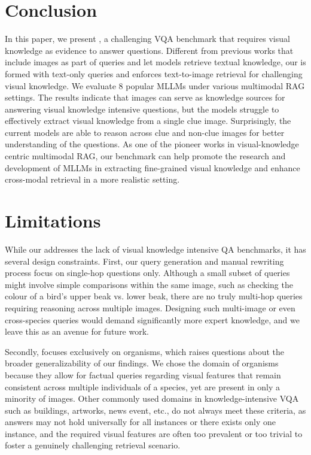 \section{Conclusion}
In this paper, we present \dsns, a challenging VQA benchmark that requires visual knowledge as evidence to answer questions. Different from previous works that include images as part of queries and let models retrieve textual knowledge, our \ds is formed with text-only queries and enforces text-to-image retrieval for challenging visual knowledge. We evaluate 8 popular MLLMs under various multimodal RAG settings. The results indicate that images can serve as knowledge sources for answering visual knowledge intensive questions, but the models struggle to effectively extract visual knowledge from a single clue image. Surprisingly, the current models are able to reason across clue and non-clue images for better understanding of the questions. As one of the pioneer works in visual-knowledge centric multimodal RAG, our benchmark can help promote the research and development of MLLMs in extracting fine-grained visual knowledge and enhance cross-modal retrieval in a more realistic setting.

\section*{Limitations}

While our \ds  addresses the lack of visual knowledge intensive QA benchmarks, it has several design constraints. First, our query generation and manual rewriting process focus on single-hop questions only. Although a small subset of queries might involve simple comparisons within the same image, such as checking the colour of a bird’s upper beak vs. lower beak, there are no truly multi-hop queries requiring reasoning across multiple images. Designing such multi-image or even cross-species queries would demand significantly more expert knowledge, and we leave this as an avenue for future work.

Secondly, \ds focuses exclusively on organisms, which raises questions about the broader generalizability of our findings. We chose the domain of organisms because they allow for factual queries regarding visual features that remain consistent across multiple individuals of a species, yet are present in only a minority of images. Other commonly used domains in knowledge-intensive VQA such as buildings, artworks, news event, etc., do not always meet these criteria, as answers may not hold universally for all instances or there exists only one instance, and the required visual features are often too prevalent or too trivial to foster a genuinely challenging retrieval scenario.

